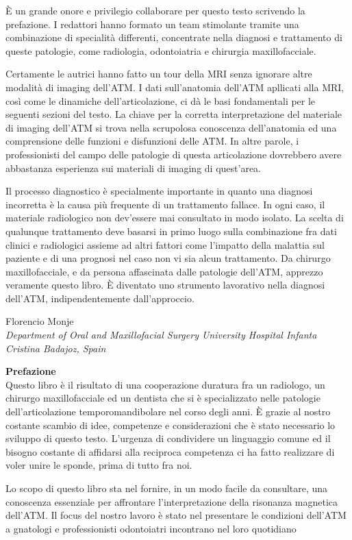 \documentclass[10pt,twocolumn,a4paper]{article}
\begin{document}
	\vspace*{0.5cm}
	È un grande onore e privilegio collaborare per questo testo scrivendo la prefazione. I redattori hanno formato un team stimolante tramite una combinazione di specialità differenti, concentrate nella diagnosi e trattamento di queste patologie, come
	radiologia, odontoiatria e chirurgia maxillofacciale.\par Certamente le autrici hanno fatto un tour della MRI senza ignorare altre modalità di imaging dell'ATM. I dati sull'anatomia dell'ATM apllicati alla MRI, così come le dinamiche dell'articolazione,
	ci dà le basi fondamentali per le seguenti sezioni del testo. La chiave per la corretta interpretazione del materiale di imaging dell'ATM si trova nella scrupolosa conoscenza dell'anatomia ed una comprensione delle funzioni e disfunzioni delle ATM.
	In altre parole, i professionisti del campo delle patologie di questa articolazione dovrebbero avere abbastanza esperienza sui materiali di imaging di quest'area.\par Il processo diagnostico è specialmente importante in quanto una diagnosi 
	incorretta è la causa più frequente di un trattamento fallace. In ogni caso, il materiale radiologico non dev'essere mai consultato in modo isolato. La scelta di qualunque trattamento deve basarsi in primo luogo sulla combinazione fra dati clinici
	e radiologici assieme ad altri fattori come l'impatto della malattia sul paziente e di una prognosi nel caso non vi sia alcun trattamento. Da chirurgo maxillofacciale, e da persona affascinata dalle patologie dell'ATM, apprezzo veramente questo libro.
	È diventato uno strumento lavorativo nella diagnosi dell'ATM, indipendentemente dall'approccio.
	\begin{flushright}
		Florencio Monje\\
		\textit{\footnotesize{Department of Oral and Maxillofacial Surgery University Hospital Infanta Cristina Badajoz, Spain}}
	\end{flushright}
	
	\newpage
	
	\textbf{\Large{Prefazione}}\\
	
	\vspace*{0.5cm}
	Questo libro è il risultato di una cooperazione duratura fra un radiologo, un chirurgo maxillofacciale ed un dentista che si è specializzato nelle patologie dell'articolazione temporomandibolare nel corso degli anni. È grazie al nostro costante scambio
	di idee, competenze e considerazioni che è stato necessario lo sviluppo di questo testo. L'urgenza di condividere un linguaggio comune ed il bisogno costante di affidarsi alla reciproca competenza ci ha fatto realizzare di voler unire le sponde, 
	prima di tutto fra noi. \par Lo scopo di questo libro sta nel fornire, in un modo facile da consultare, una conoscenza essenziale per affrontare l'interpretazione della risonanza magnetica dell'ATM. Il focus del nostro lavoro è stato nel presentare
	le condizioni dell'ATM a gnatologi e professionisti odontoiatri incontrano nel loro quotidiano
	
	
\end{document}

